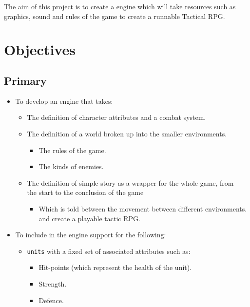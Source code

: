 The aim of this project is to create a engine which will take resources such as graphics, sound and rules of the game to create a runnable Tactical RPG.

\section{Objectives}

\subsection{Primary} \label{primary}
\begin{itemize}
\item To develop an engine that takes:
\begin{itemize}
	\item The definition of character attributes and a combat system.
	
	\item The definition of a world broken up into the smaller environments.
	\begin{itemize}
		\item The rules of the game.
		\item The kinds of enemies.
	\end{itemize}
	
	\item The definition of simple story as a wrapper for the whole game, from\\
	the start to the conclusion of the game
	\begin{itemize}
		\item Which is told between the movement between different environments.\\
		and create a playable tactic RPG.
	\end{itemize}
\end{itemize}

\item To include in the engine support for the following:
\begin{itemize}
	\item \texttt{units} with a fixed set of associated attributes such as:
	\begin{itemize}
		\item Hit-points (which represent the health of the unit).
		
		\item Strength.
		
		\item Defence.
		

\end{itemize}
\end{itemize}
\end{itemize}
